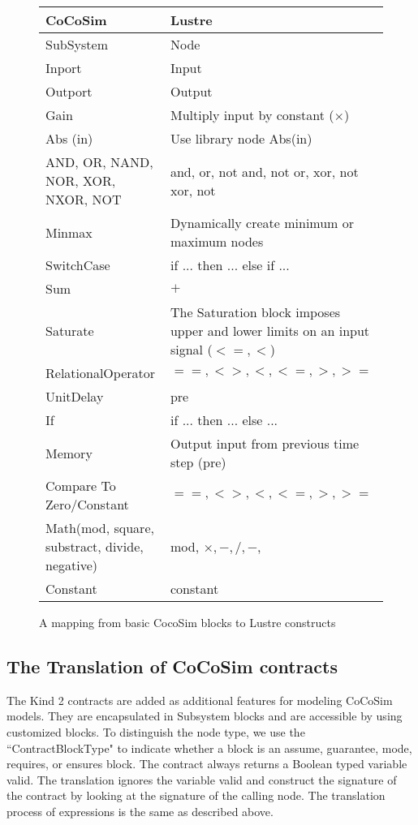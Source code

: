 \documentclass{article}
\begin{document}
\begin{figure}[t]
\centering
{
\begin{tabular}{lp{5cm}}
\hline
\textbf{CoCoSim} & \textbf{Lustre}  \\
\hline
SubSystem & 
Node
\\
Inport &
Input
\\
Outport &
Output
\\
Gain &
Multiply input by constant ($\times$)
\\

Abs (in) &
Use library node Abs(in)
\\

AND, OR, NAND, NOR, XOR, NXOR, NOT
&
and, or, not and, not or, xor, not xor, not
\\

Minmax &
{Dynamically create minimum or maximum nodes}
\\

SwitchCase &
{if ... then ... else if ... }
\\

Sum &
$+$
\\

Saturate &
The Saturation block imposes upper and lower limits on an input signal ($<=, <$)
\\

RelationalOperator &
$==, <>, <, <=, >, >=$
\\

UnitDelay &
pre
\\

If &
if ... then ... else ...
\\

Memory &
Output input from previous time step (pre)
\\

Compare To Zero/Constant  &
$==, <>, <, <=, >, >=$
\\

Math(mod, square, substract, divide, negative) &
mod, $\times, -, /, - $, 
\\

Constant &
constant
\\

\hline
\end{tabular}
}
\caption{A mapping from basic CocoSim blocks to Lustre constructs}
\label{basicmapping}
\end{figure}


\subsection{The Translation of CoCoSim contracts}
The Kind 2 contracts are added as additional features for modeling CoCoSim models.
They are encapsulated in \textsf{Subsystem} blocks and are accessible by using customized 
blocks.
To distinguish the node type, we use the ``ContractBlockType" to indicate whether a block 
is an \textsf{assume}, \textsf{guarantee}, \textsf{mode}, \textsf{requires}, or \textsf{ensures} block.
The contract always returns a Boolean typed variable \textsf{valid}.
The translation ignores the variable \textsf{valid} and construct the signature 
of the contract by looking at the signature of the calling node.
The translation process of expressions is the same as described above. 
\end{document}

